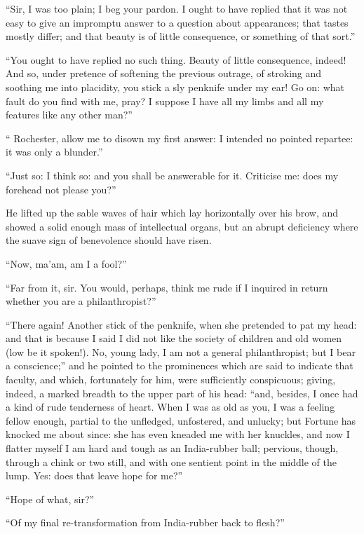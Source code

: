 \enquote{Sir, I was too plain; I beg your pardon. I ought to have
replied that it was not easy to give an impromptu answer to a question
about appearances; that tastes mostly differ; and that beauty is of
little consequence, or something of that sort.}

\enquote{You ought to have replied no such thing. Beauty of little
consequence, indeed! And so, under pretence of softening the previous
outrage, of stroking and soothing me into placidity, you stick a sly
penknife under my ear! Go on: what fault do you find with me, pray? I
suppose I have all my limbs and all my features like any other man?}

\enquote{\Mr{} Rochester, allow me to disown my first answer: I intended
no pointed repartee: it was only a blunder.}

\enquote{Just so: I think so: and you shall be answerable for it. 
Criticise me: does my forehead not please you?}

He lifted up the sable waves of hair which lay horizontally over his
brow, and showed a solid enough mass of intellectual organs, but an
abrupt deficiency where the suave sign of benevolence should have risen.

\enquote{Now, ma'am, am I a fool?}

\enquote{Far from it, sir. You would, perhaps, think me rude if I
inquired in return whether you are a philanthropist?}

\enquote{There again! Another stick of the penknife, when she pretended
to pat my head: and that is because I said I did not like the society of
children and old women (low be it spoken!). No, young lady, I am not a
general philanthropist; but I bear a conscience;} and he pointed to the
prominences which are said to indicate that faculty, and which,
fortunately for him, were sufficiently conspicuous; giving, indeed, a
marked breadth to the upper part of his head: \enquote{and, besides, I
once had a kind of rude tenderness of heart. When I was as old as you,
I was a feeling fellow enough, partial to the unfledged, unfostered, and
unlucky; but Fortune has knocked me about since: she has even kneaded me
with her knuckles, and now I flatter myself I am hard and tough as an
India-rubber ball; pervious, though, through a chink or two still, and
with one sentient point in the middle of the lump. Yes: does that leave
hope for me?}

\enquote{Hope of what, sir?}

\enquote{Of my final re-transformation from India-rubber back to flesh?}

